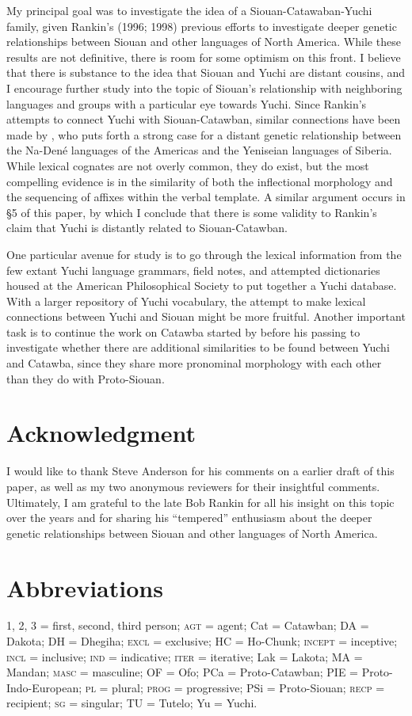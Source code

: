 \documentclass[output=paper]{LSP/langsci}
\begin{document}
My principal goal was to investigate the idea of a Siouan-Catawaban-Yuchi family, given Rankin's (1996; 1998) previous efforts to investigate deeper genetic relationships between Siouan and other languages of North America. While these results are not definitive, there is room for some optimism on this front. I believe that there is substance to the idea that Siouan and Yuchi are distant cousins, and I encourage further study into the topic of Siouan's relationship with neighboring languages and groups with a particular eye towards Yuchi. Since Rankin's attempts to connect Yuchi with Siouan-Catawban, similar connections have been made by \citet{Vajda2010}, who puts forth a strong case for a distant genetic relationship between the Na-Den\'e languages of the Americas and the Yeniseian languages of Siberia. While lexical cognates are not overly common, they do exist, but the most compelling evidence is in the similarity of both the inflectional morphology and the sequencing of affixes within the verbal template. A similar argument occurs in \S5 of this paper, by which I conclude that there is some validity to Rankin's claim that Yuchi is distantly related to Siouan-Catawban.

One particular avenue for study is to go through the lexical information from the few extant Yuchi language grammars, field notes, and attempted dictionaries housed at the American Philosophical Society to put together a Yuchi database. With a larger repository of Yuchi vocabulary, the attempt to make lexical connections between Yuchi and Siouan might be more fruitful. Another important task is to continue the work on Catawba started by \citet{Rudes2007} before his passing to investigate whether there are additional similarities to be found between Yuchi and Catawba, since they share more pronominal morphology with each other than they do with Proto-Siouan.

\section*{Acknowledgment}

I would like to thank Steve Anderson for his comments on a earlier draft of this paper, as well as my two anonymous reviewers for their insightful comments. Ultimately, I am grateful to the late Bob Rankin for all his insight on this topic over the years and for sharing his ``tempered'' enthusiasm about the deeper genetic relationships between Siouan and other languages of North America.

\section*{Abbreviations}
1, 2, 3 = first, second, third person; \textsc{agt} = agent; Cat = Catawban; DA = Dakota; DH = Dhegiha; \textsc{excl} = exclusive; HC = Ho-Chunk; \textsc{incept} = inceptive; \textsc{incl} = inclusive; \textsc{ind} = indicative; \textsc{iter} = iterative; Lak = Lakota; MA = Mandan; \textsc{masc} = masculine; OF = Ofo; PCa = Proto-Catawban; PIE = Proto-Indo-European; \textsc{pl} = plural; \textsc{prog} = progressive; PSi = Proto-Siouan; \textsc{recp} = recipient; \textsc{sg} = singular; TU = Tutelo; Yu = Yuchi.
\end{document}
